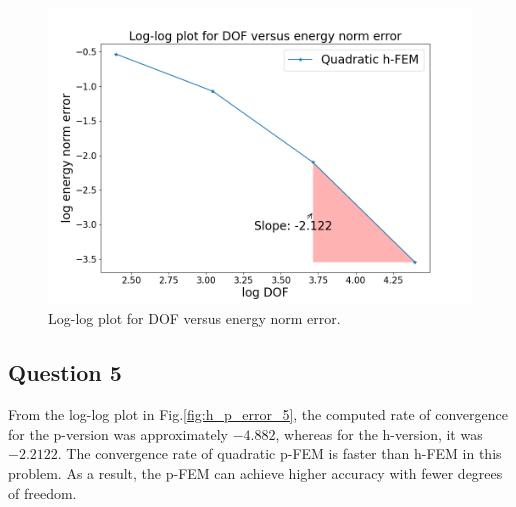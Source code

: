 \documentclass[twoside,twocolumn,10pt]{article}
\begin{document}
\begin{figure}[!ht]
  \centering
  \includegraphics[width=1.\linewidth]{Q1/logDOF_q_4.png}
  \caption{Log-log plot for DOF versus energy norm error.}
  \label{fig:h_error_4}
\end{figure}

\subsection{Question 5}

From the log-log plot in Fig.\ref{fig:h_p_error_5}, the computed rate of convergence for the p-version was approximately \(-4.882\), whereas for the h-version, it was \(-2.2122\). The convergence rate of quadratic p-FEM is faster than h-FEM in this problem.  As a result, the p-FEM can achieve higher accuracy with fewer degrees of freedom.
\end{document}
